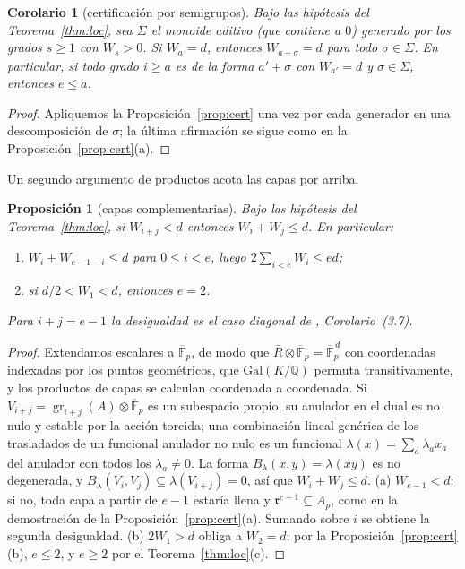 \documentclass[11pt,a4paper]{article}
\newtheorem{proposition}[theorem]{Proposición}
\newtheorem{corollary}[theorem]{Corolario}
\theoremstyle{definition}
\newcommand{\QQ}{\mathbb{Q}}
\newcommand{\FF}{\mathbb{F}}
\newcommand{\rad}{\mathfrak{r}}
\newcommand{\gr}{\operatorname{gr}}
\begin{document}
\begin{corollary}[certificación por semigrupos]\label{cor:semigrupo}
Bajo las hipótesis del Teorema~\ref{thm:loc}, sea $\Sigma$ el monoide aditivo (que contiene a $0$) generado por los grados $s\ge1$
con $W_s>0$. Si $W_a=d$, entonces $W_{a+\sigma}=d$ para todo $\sigma\in\Sigma$. En particular, si todo grado $i\ge a$
es de la forma $a'+\sigma$ con $W_{a'}=d$ y $\sigma\in\Sigma$, entonces $e\le a$.
\end{corollary}

\begin{proof}
Apliquemos la Proposición~\ref{prop:cert} una vez por cada generador en una descomposición de $\sigma$; la última
afirmación se sigue como en la Proposición~\ref{prop:cert}(a).
\end{proof}

\noindent Un segundo argumento de productos acota las capas por arriba.

\begin{proposition}[capas complementarias]\label{prop:mono}
Bajo las hipótesis del Teorema~\ref{thm:loc}, si $W_{i+j}<d$ entonces $W_i+W_j\le d$. En particular:
\begin{enumerate}
\item[(a)] $W_i+W_{e-1-i}\le d$ para $0\le i<e$, luego $2\sum_{i<e}W_i\le ed$;
\item[(b)] si $d/2<W_1<d$, entonces $e=2$.
\end{enumerate}
Para $i+j=e-1$ la desigualdad es el caso diagonal de \cite{CDK94}, Corolario~(3.7).
\end{proposition}

\begin{proof}
Extendamos escalares a $\overline{\FF}_p$, de modo que $\bar R\otimes\overline{\FF}_p=\overline{\FF}_p^{\,d}$ con
coordenadas indexadas por los puntos geométricos, que $\mathrm{Gal}(K/\QQ)$ permuta transitivamente, y los productos
de capas se calculan coordenada a coordenada. Si $V_{i+j}=\gr_{i+j}(A)\otimes\overline{\FF}_p$ es un subespacio propio,
su anulador en el dual es no nulo y estable por la acción torcida; una combinación lineal genérica de los trasladados
de un funcional anulador no nulo es un funcional $\lambda(x)=\sum_a\lambda_ax_a$ del anulador con todos los
$\lambda_a\neq0$. La forma $B_\lambda(x,y)=\lambda(xy)$ es no degenerada, y $B_\lambda(V_i,V_j)\subseteq
\lambda(V_{i+j})=0$, así que $W_i+W_j\le d$. (a) $W_{e-1}<d$: si no, toda capa a partir de $e-1$ estaría llena y
$\rad^{e-1}\subseteq A_p$, como en la demostración de la Proposición~\ref{prop:cert}(a). Sumando sobre $i$ se obtiene la
segunda desigualdad. (b) $2W_1>d$ obliga a $W_2=d$; por la Proposición~\ref{prop:cert}(b), $e\le2$, y $e\ge2$ por el
Teorema~\ref{thm:loc}(c).
\end{proof}
\end{document}
